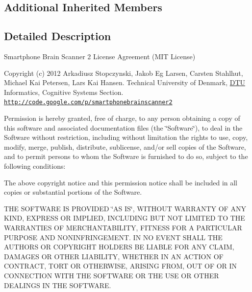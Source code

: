 \subsection*{Additional Inherited Members}


\subsection{Detailed Description}
Smartphone Brain Scanner 2 License Agreement (M\-I\-T License)

Copyright (c) 2012 Arkadiusz Stopczynski, Jakob Eg Larsen, Carsten Stahlhut, Michael Kai Petersen, Lars Kai Hansen. Technical University of Denmark, \hyperlink{namespaceDTU}{D\-T\-U} Informatics, Cognitive Systems Section. \href{http://code.google.com/p/smartphonebrainscanner2}{\tt http\-://code.\-google.\-com/p/smartphonebrainscanner2}

Permission is hereby granted, free of charge, to any person obtaining a copy of this software and associated documentation files (the \char`\"{}\-Software\char`\"{}), to deal in the Software without restriction, including without limitation the rights to use, copy, modify, merge, publish, distribute, sublicense, and/or sell copies of the Software, and to permit persons to whom the Software is furnished to do so, subject to the following conditions\-:

The above copyright notice and this permission notice shall be included in all copies or substantial portions of the Software.

T\-H\-E S\-O\-F\-T\-W\-A\-R\-E I\-S P\-R\-O\-V\-I\-D\-E\-D \char`\"{}\-A\-S I\-S\char`\"{}, W\-I\-T\-H\-O\-U\-T W\-A\-R\-R\-A\-N\-T\-Y O\-F A\-N\-Y K\-I\-N\-D, E\-X\-P\-R\-E\-S\-S O\-R I\-M\-P\-L\-I\-E\-D, I\-N\-C\-L\-U\-D\-I\-N\-G B\-U\-T N\-O\-T L\-I\-M\-I\-T\-E\-D T\-O T\-H\-E W\-A\-R\-R\-A\-N\-T\-I\-E\-S O\-F M\-E\-R\-C\-H\-A\-N\-T\-A\-B\-I\-L\-I\-T\-Y, F\-I\-T\-N\-E\-S\-S F\-O\-R A P\-A\-R\-T\-I\-C\-U\-L\-A\-R P\-U\-R\-P\-O\-S\-E A\-N\-D N\-O\-N\-I\-N\-F\-R\-I\-N\-G\-E\-M\-E\-N\-T. I\-N N\-O E\-V\-E\-N\-T S\-H\-A\-L\-L T\-H\-E A\-U\-T\-H\-O\-R\-S O\-R C\-O\-P\-Y\-R\-I\-G\-H\-T H\-O\-L\-D\-E\-R\-S B\-E L\-I\-A\-B\-L\-E F\-O\-R A\-N\-Y C\-L\-A\-I\-M, D\-A\-M\-A\-G\-E\-S O\-R O\-T\-H\-E\-R L\-I\-A\-B\-I\-L\-I\-T\-Y, W\-H\-E\-T\-H\-E\-R I\-N A\-N A\-C\-T\-I\-O\-N O\-F C\-O\-N\-T\-R\-A\-C\-T, T\-O\-R\-T O\-R O\-T\-H\-E\-R\-W\-I\-S\-E, A\-R\-I\-S\-I\-N\-G F\-R\-O\-M, O\-U\-T O\-F O\-R I\-N C\-O\-N\-N\-E\-C\-T\-I\-O\-N W\-I\-T\-H T\-H\-E S\-O\-F\-T\-W\-A\-R\-E O\-R T\-H\-E U\-S\-E O\-R O\-T\-H\-E\-R D\-E\-A\-L\-I\-N\-G\-S I\-N T\-H\-E S\-O\-F\-T\-W\-A\-R\-E. 

